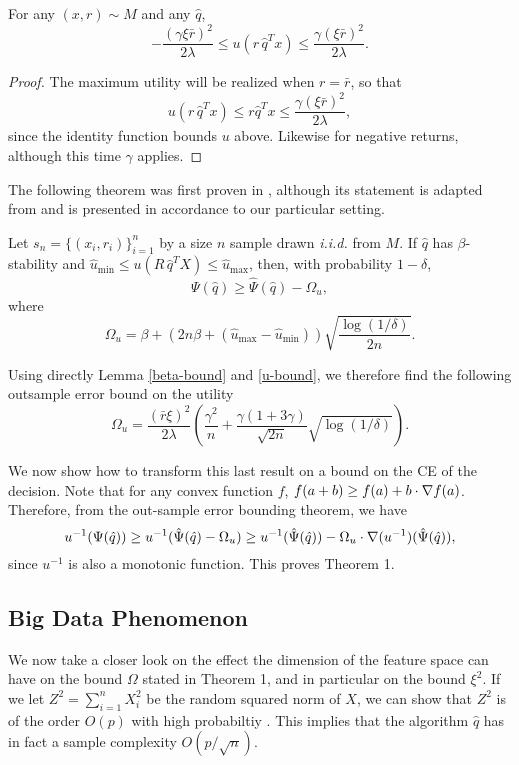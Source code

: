 \begin{lemma}
  \label{u-bound}
  For any $(x,r)\sim M$ and any $\hat q$,
  \[
    -\frac{(\gamma\xi \bar r)^2}{2\lambda} \leq u(r\,\hat q^Tx) \leq \frac{\gamma(\xi\bar r)^2}{2\lambda}.
  \]
\end{lemma}

\begin{proof}
  The maximum utility will be realized when $r = \bar r$, so that
  \[
    u(r\,\hat q^T x) \leq r {\hat q}^T x \leq \frac{\gamma(\xi\bar r)^2}{2\lambda},
  \]
  since the identity function bounds $u$ above. Likewise for negative returns, although
  this time $\gamma$ applies. 
\end{proof}

The following theorem was first proven in \cite{bousquet2002stability}, although its
statement is adapted from \cite{mohri2012foundations} and is presented in accordance to
our particular setting.
\begin{thm*}
  Let $s_n=\{(x_i,r_i)\}_{i=1}^n$ by a size $n$ sample drawn \textit{i.i.d.} from $M$. If
  $\hat q$ has $\beta$-stability and
  $\hat u_{\min}\leq u(R\,\hat q^TX) \leq \hat u_{\max}$, then, with probability
  $1-\delta$, 
  \[
    \Psi(\hat q) \geq \hat\Psi(\hat q) - \Omega_u,
  \]
  where
  \[
    \Omega_u = \beta + (2n\beta + (\hat u_{\max}-\hat u_{\min}))\sqrt{\frac{\log(1/\delta)}{2n}}.
  \]
\end{thm*}

Using directly Lemma \ref{beta-bound} and \ref{u-bound}, we therefore find the following outsample
error bound on the utility
\[
  \Omega_u = \frac{(\bar r\xi)^2}{2\lambda} \left(\frac{\gamma^2}{n} + \frac{\gamma(1+3\gamma)}{\sqrt{2n}}\sqrt{\log(1/\delta)}\right).
\]

We now show how to transform this last result on a bound on the CE of the decision. Note
that for any convex function $f$, $f(a+b) \geq f(a) + b\cdot\nabla f(a)$. Therefore, from
the out-sample error bounding theorem, we have
\[
  u^{-1}(\Psi(\hat q)) \geq u^{-1}(\hat\Psi(\hat q) - \Omega_u) \geq u^{-1}(\hat\Psi(\hat
  q)) - \Omega_u\cdot\nabla(u^{-1})(\hat\Psi(\hat q)),
\]
since $u^{-1}$ is also a monotonic function. This proves Theorem 1. 


\subsection{Big Data Phenomenon}
We now take a closer look on the effect the dimension of the feature space can have on the
bound $\Omega$ stated in Theorem 1, and in particular on the bound $\xi^2$. If we let
$Z^2 = \sum_{i=1}^nX_i^2$ be the random squared norm of $X$, we can show that $Z^2$ is of
the order $O(p)$ with high probabiltiy . This implies that the algorithm $\hat q$ has in
fact a sample complexity $O(p/\sqrt{n})$.

